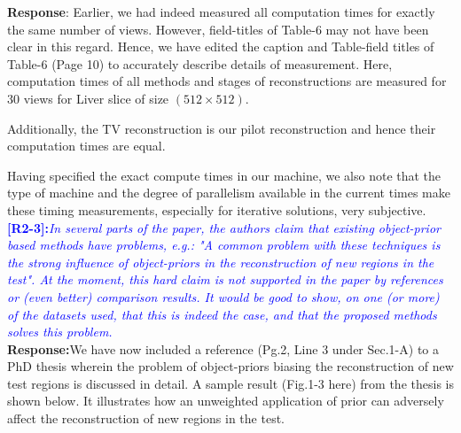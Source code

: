 \documentclass{article}
\begin{document}
\textbf{Response}: Earlier, we had indeed measured all computation times for exactly the same number of views. However, field-titles of Table-6 may not have been clear in this regard. Hence, we have edited the caption and Table-field titles of Table-6 (Page 10) to accurately describe details of measurement. Here, computation times of all methods and stages of reconstructions are measured for 30 views for  Liver slice of size $(512 \times 512)$.

Additionally, the TV reconstruction is our pilot reconstruction and hence their computation times are equal.

Having specified the exact compute times in our machine, we also note that the type of machine and the degree of parallelism available in the current times make these timing measurements, especially for iterative solutions, very subjective.
\\

\textcolor{blue}{\textbf{[R2-3]:}\textit{In several parts of the paper, the authors claim that existing object-prior based methods have problems, e.g.: "A common problem with these techniques is the strong influence of object-priors in the reconstruction of new regions in the test". At the moment, this hard claim is not supported in the paper by references or (even better) comparison results. It would be good to show, on one (or more) of the datasets used, that this is indeed the case, and that the proposed methods solves this problem.}}\\

\textbf{Response:}We have now included a reference (Pg.2, Line 3 under Sec.1-A) to a PhD thesis wherein the problem of object-priors biasing the reconstruction of new test regions is discussed in detail. 
A sample result (Fig.1-3 here) from the thesis is shown below. It illustrates how an unweighted application of prior can adversely affect the reconstruction of new regions in the test.\\
\end{document}
